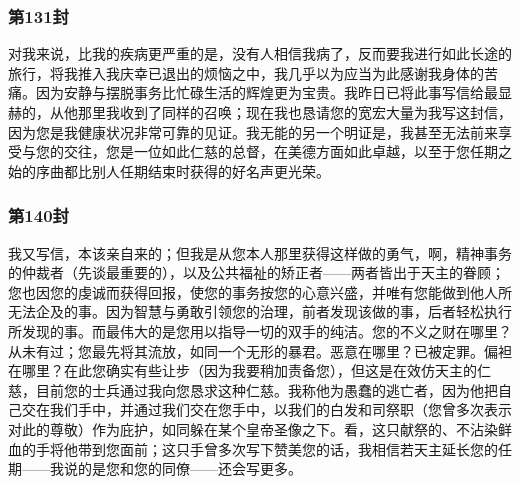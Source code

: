 
\subsubsection{第131封}

\par

对我来说，比我的疾病更严重的是，没有人相信我病了，反而要我进行如此长途的旅行，将我推入我庆幸已退出的烦恼之中，我几乎以为应当为此感谢我身体的苦痛。因为安静与摆脱事务比忙碌生活的辉煌更为宝贵。我昨日已将此事写信给最显赫的，从他那里我收到了同样的召唤；现在我也恳请您的宽宏大量为我写这封信，因为您是我健康状况非常可靠的见证。我无能的另一个明证是，我甚至无法前来享受与您的交往，您是一位如此仁慈的总督，在美德方面如此卓越，以至于您任期之始的序曲都比别人任期结束时获得的好名声更光荣。\par


\subsubsection{第140封}

我又写信，本该亲自来的；但我是从您本人那里获得这样做的勇气，啊，精神事务的仲裁者（先谈最重要的），以及公共福祉的矫正者——两者皆出于天主的眷顾；您也因您的虔诚而获得回报，使您的事务按您的心意兴盛，并唯有您能做到他人所无法企及的事。因为智慧与勇敢引领您的治理，前者发现该做的事，后者轻松执行所发现的事。而最伟大的是您用以指导一切的双手的纯洁。您的不义之财在哪里？从未有过；您最先将其流放，如同一个无形的暴君。恶意在哪里？已被定罪。偏袒在哪里？在此您确实有些让步（因为我要稍加责备您），但这是在效仿天主的仁慈，目前您的士兵通过我向您恳求这种仁慈。我称他为愚蠢的逃亡者，因为他把自己交在我们手中，并通过我们交在您手中，以我们的白发和司祭职（您曾多次表示对此的尊敬）作为庇护，如同躲在某个皇帝圣像之下。看，这只献祭的、不沾染鲜血的手将他带到您面前；这只手曾多次写下赞美您的话，我相信若天主延长您的任期——我说的是您和您的同僚——还会写更多。\par

